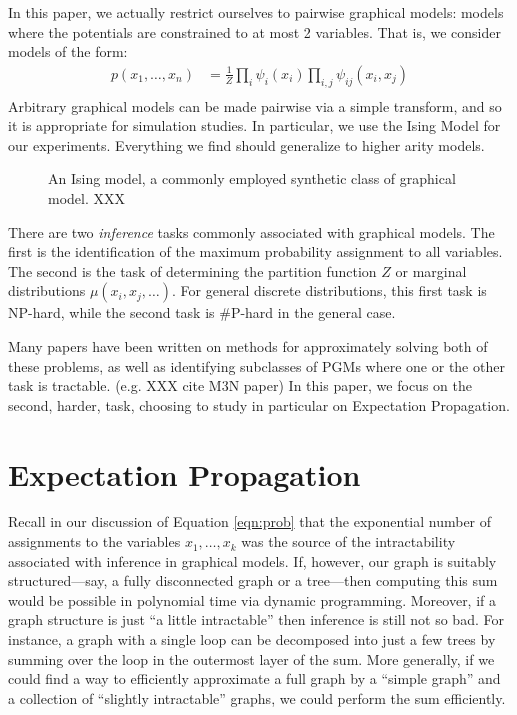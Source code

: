 \documentclass[times, 10pt,twocolumn]{article}
\begin{document}
In this paper, we actually restrict ourselves to pairwise graphical models:
models where the potentials are constrained to at most 2 variables.
That is, we consider models of the form:
\begin{equation}
  \begin{split}
    p(x_1, \ldots, x_n)  &= \frac1Z \prod_i \psi_i(x_i) \prod_{i,j}
    \psi_{ij}(x_i, x_j) \\
   \end{split}
   \label{eqn:pairwise}
 \end{equation}
Arbitrary graphical models can be made pairwise via a simple
transform, and so it is appropriate for simulation studies. In
particular, we use the Ising Model for our experiments. Everything
we find should generalize to higher arity models.

\begin{figure}[t]
  \caption{An Ising model, a commonly employed synthetic class of
  graphical model. XXX}
  \label{fig:ising}
\end{figure}

There are two \textit{inference} tasks commonly associated with
graphical models. The first is the identification of the maximum
probability assignment to all variables. The second is the task of
determining the partition function $Z$ or marginal distributions
$\mu(x_i, x_j, \ldots)$.  For general discrete distributions, this
first task is NP-hard, while the second task is \#P-hard in the
general case.

Many papers have been written on methods for approximately solving
both of these problems, as well as identifying subclasses of PGMs
where one or the other task is tractable. (e.g. XXX cite M3N paper)
In this paper, we focus on the second, harder, task, choosing to
study in particular on Expectation Propagation\cite{Minka01}.

\section{Expectation Propagation}

Recall in our discussion of Equation \ref{eqn:prob} that the
exponential number of assignments to the variables $x_1,\ldots,x_k$
was the source of the intractability associated with inference in
graphical models. If, however, our graph is suitably structured---say,
a fully disconnected graph or a tree---then computing this sum would
be possible in polynomial time via dynamic programming. Moreover,
if a graph structure is just ``a little intractable'' then inference
is still not so bad. For instance, a graph with a single loop can
be decomposed into just a few trees by summing over the loop in the
outermost layer of the sum. More generally, if we could find a way
to efficiently approximate a full graph by a ``simple graph'' and a
collection of ``slightly intractable'' graphs, we could perform the
sum efficiently.
\end{document}
